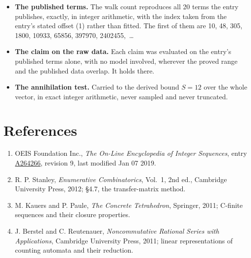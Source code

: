 \documentclass[11pt]{article}
\theoremstyle{definition}
\begin{document}
\begin{itemize}

\item {\bfseries The published terms.} The walk count reproduces all 20 terms the entry publishes, exactly, in integer arithmetic, with the index taken from the entry's stated offset (1) rather than fitted. The first of them are 10, 48, 305, 1800, 10933, 65856, 397970, 2402455,~\dots

\item {\bfseries The claim on the raw data.} Each claim was evaluated on the entry's published terms alone, with no model involved, wherever the proved range and the published data overlap. It holds there.

\item {\bfseries The annihilation test.} Carried to the derived bound $S = 12$ over the whole vector, in exact integer arithmetic, never sampled and never truncated.

\end{itemize}

\section{References}

\begin{enumerate}

\item OEIS Foundation Inc., \emph{The On-Line Encyclopedia of Integer Sequences}, entry \href{https://oeis.org/A264266}{A264266}, revision 9, last modified Jan 07 2019.

\item R. P. Stanley, \emph{Enumerative Combinatorics}, Vol.~1, 2nd ed., Cambridge University Press, 2012; \S4.7, the transfer-matrix method.

\item M. Kauers and P. Paule, \emph{The Concrete Tetrahedron}, Springer, 2011; C-finite sequences and their closure properties.

\item J. Berstel and C. Reutenauer, \emph{Noncommutative Rational Series with Applications}, Cambridge University Press, 2011; linear representations of counting automata and their reduction.

\end{enumerate}
\end{document}

